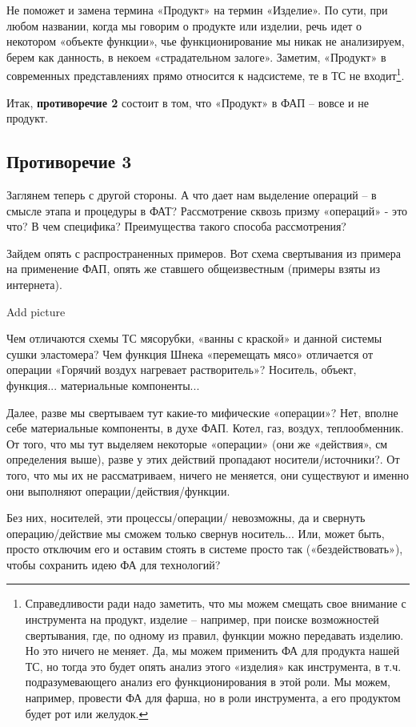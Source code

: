 \documentclass[11pt,a4paper]{article}
\begin{document}
Не поможет и замена термина «Продукт» на термин «Изделие». По сути, при любом
названии, когда мы говорим о продукте или изделии, речь идет о некотором
«объекте функции», чье функционирование мы никак не анализируем, берем как
данность, в некоем «страдательном залоге». Заметим, «Продукт» в современных
представлениях прямо относится к надсистеме, те в ТС не
входит\footnote{Справедливости ради надо заметить, что мы можем смещать свое
  внимание с инструмента на продукт, изделие – например, при поиске
  возможностей свертывания, где, по одному из правил, функции можно передавать
  изделию. Но это ничего не меняет. Да, мы можем применить ФА для продукта
  нашей ТС, но тогда это будет опять анализ этого «изделия» как инструмента, в
  т.ч. подразумевающего анализ его функционирования в этой роли. Мы можем,
  например, провести ФА для фарша, но в роли инструмента, а его продуктом
  будет рот или желудок.}.

Итак, \textbf{противоречие 2} состоит в том, что «Продукт» в ФАП – вовсе и не
продукт.

\subsection{Противоречие 3}
Заглянем теперь с другой стороны. А что дает нам выделение операций – в смысле
этапа и процедуры в ФАТ? Рассмотрение сквозь призму «операций» - это что? В
чем специфика? Преимущества такого способа рассмотрения?

Зайдем опять с распространенных примеров. Вот схема свертывания из примера на
применение ФАП, опять же ставшего общеизвестным (примеры взяты из интернета).
\begin{center}
  Add picture
\end{center}
Чем отличаются схемы ТС мясорубки, «ванны с краской» и данной системы сушки
эластомера? Чем функция Шнека «перемещать мясо» отличается от операции
«Горячий воздух нагревает растворитель»? Носитель, объект, функция...
материальные компоненты...

Далее, разве мы свертываем тут какие-то мифические «операции»? Нет, вполне себе
материальные компоненты, в духе ФАП. Котел, газ, воздух, теплообменник. От того, что мы
тут выделяем некоторые «операции» (они же «действия», см определения выше), разве у
этих действий пропадают носители/источники?. От того, что мы их не рассматриваем,
ничего не меняется, они существуют и именно они выполняют
операции/действия/функции.

Без них, носителей, эти процессы/операции/ невозможны, да и свернуть
операцию/действие мы сможем только свернув носитель... Или, может быть, просто
отключим его и оставим стоять в системе просто так («бездействовать»), чтобы
сохранить идею ФА для технологий?
\end{document}
